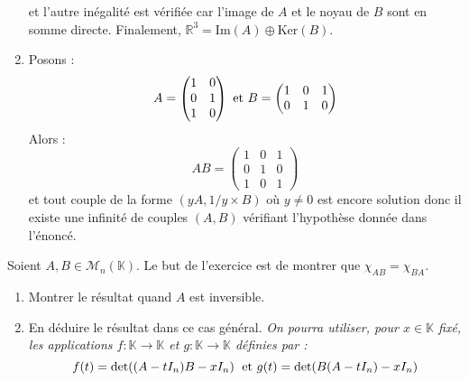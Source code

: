 \documentclass[a4paper,10pt]{report}
\begin{document}
\begin{enumerate}
et l'autre inégalité est vérifiée car l'image de $A$ et le noyau de $B$ sont en somme directe. Finalement, $\mathbb{R}^3 = \textrm{Im}(A) \oplus \textrm{Ker}(B)$.
\item Posons :
$$ A  = \begin{pmatrix}
1 & 0 \\
0 & 1\\
1 & 0 \\
\end{pmatrix} 
\hbox{ et } B = \begin{pmatrix}
1 & 0 & 1 \\
0 & 1 & 0
\end{pmatrix}$$
Alors :
$$ AB = \begin{pmatrix}
1 & 0 & 1 \\
0 & 1 & 0 \\
1 & 0 & 1 
\end{pmatrix}$$
et tout couple de la forme $(yA, 1/y \times B)$ où $y \neq 0$ est encore solution donc il existe une infinité de couples $(A,B)$ vérifiant l'hypothèse donnée dans l'énoncé.
\end{enumerate}

\begin{Exercice}{} Soient $A,B \in \mathcal{M}_{n}(\mathbb{K})$. Le but de l'exercice est de montrer que $\chi_{AB} = \chi_{BA}$.
\begin{enumerate}
\item Montrer le résultat quand $A$ est inversible.
\item En déduire le résultat dans ce cas général. \textit{On pourra utiliser, pour $x \in \mathbb{K}$ fixé, les applications $f : \mathbb{K} \rightarrow \mathbb{K}$ et $g : \mathbb{K} \rightarrow \mathbb{K}$ définies par :}
$$ f(t) = \textrm{det}((A-t I_n)B -x I_n) \; \hbox{ et } g(t) = \textrm{det}(B(A-tI_n)-xI_n)$$
\end{enumerate}
\end{Exercice}

\corr 
\end{document}

